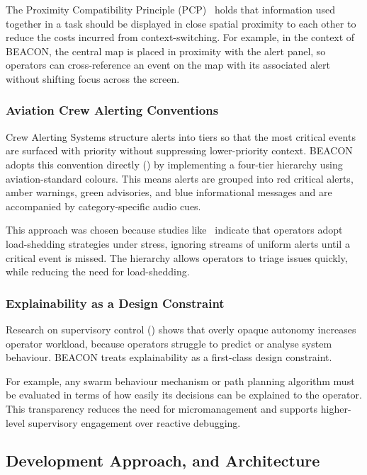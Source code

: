 The Proximity Compatibility Principle (PCP)~\cite{doi:10.1518/001872095779049408} holds that information used together in a task should be displayed in close spatial proximity to each other to reduce the costs incurred from context-switching.
For example, in the context of BEACON, the central map is placed in proximity with the alert panel, so operators can cross-reference an event on the map with its associated alert without shifting focus across the screen.

\subsubsection{Aviation Crew Alerting Conventions}

Crew Alerting Systems structure alerts into tiers so that the most critical events are surfaced with priority without suppressing lower-priority context.
BEACON adopts this convention directly (\cite{RN3}) by implementing a four-tier hierarchy using aviation-standard colours.
This means alerts are grouped into red critical alerts, amber warnings, green advisories, and blue informational messages and are accompanied by category-specific audio cues.

This approach was chosen because studies like~\cite{CUMMINGS2007339} indicate that operators adopt load-shedding strategies under stress, ignoring streams of uniform alerts until a critical event is missed.
The hierarchy allows operators to triage issues quickly, while reducing the need for load-shedding.

\subsubsection{Explainability as a Design Constraint}

Research on supervisory control (\cite{AUTOMATIONEFFECTONUAVROUTING}) shows that overly opaque autonomy increases operator workload, because operators struggle to predict or analyse system behaviour.
BEACON treats explainability as a first-class design constraint.

For example, any swarm behaviour mechanism or path planning algorithm must be evaluated in terms of how easily its decisions can be explained to the operator.
This transparency reduces the need for micromanagement and supports higher-level supervisory engagement over reactive debugging.

\subsection{Development Approach, and Architecture}\label{subsec:development-approach-and-architecture}

